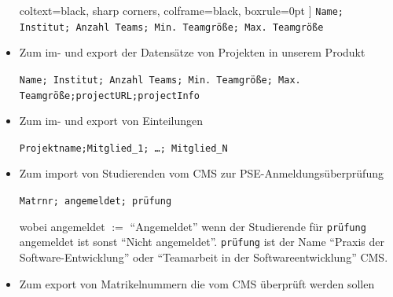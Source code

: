 \documentclass[parskip=full]{scrartcl}
\begin{document}
\begin{itemize}
\begin{tcolorbox}
 coltext=black, %
 sharp corners, %
 colframe=black, %
 boxrule=0pt %
 ]
 \texttt{Name; Institut; Anzahl Teams; Min. Teamgröße; Max. Teamgröße}
  \end{tcolorbox}
  \item Zum im- und export der Datensätze von Projekten in unserem Produkt \\
  \begin{tcolorbox}[enhanced jigsaw, %
 colback=testgrauRGB %
 coltext=black, %
 sharp corners, %
 colframe=black, %
 boxrule=0pt %
 ]
 \texttt{Name; Institut; Anzahl Teams; Min. Teamgröße; Max. Teamgröße;projectURL;projectInfo}
  \end{tcolorbox}
  \item Zum im- und export von Einteilungen \\ \begin{tcolorbox}[enhanced
  jigsaw,
 colback=testgrauRGB %
 coltext=black, %
 sharp corners, %
 colframe=black, %
 boxrule=0pt %
 ]
 \texttt{Projektname;Mitglied_1; \ldots ; Mitglied_N}
  \end{tcolorbox}
   \item Zum import von Studierenden vom CMS zur
   PSE-Anmeldungsüberprüfung 
   \\
   \begin{tcolorbox}[enhanced jigsaw,
 colback=testgrauRGB %
 coltext=black, %
 sharp corners, %
 colframe=black, %
 boxrule=0pt %
 ]
 \texttt{Matrnr; angemeldet; prüfung}
\end{tcolorbox}
 wobei angemeldet $:=$ \enquote{Angemeldet} wenn der Studierende für
 \texttt{prüfung} angemeldet ist sonst \enquote{Nicht angemeldet}.
 \texttt{prüfung} ist der Name \enquote{Praxis der Software-Entwicklung} oder
 \enquote{Teamarbeit in der Softwareentwicklung} CMS.
   \item Zum export von Matrikelnummern die vom CMS überprüft werden sollen \\

\end{itemize}
\end{document}

